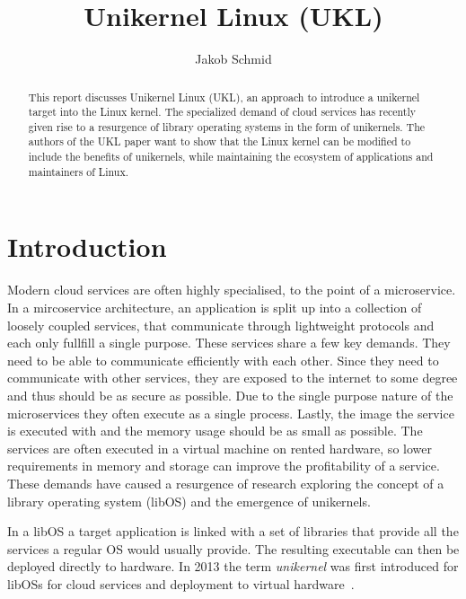 \documentclass[10pt,twocolumn,a4paper]{article}
\author{Jakob Schmid}
\begin{document}
\title{Unikernel Linux (UKL)}

\newcommand{\todo}[1]{{\texttt{[#1]}}}
\newcommand{\code}[1]{{\tt \small{#1}}}
\newcommand{\refsec}[1]{{§~\ref{#1}}}

\maketitle

\begin{abstract}
  This report discusses Unikernel Linux (UKL), an approach to introduce a
  unikernel target into the Linux kernel.
  The specialized demand of cloud services has recently given rise
  to a resurgence of library operating systems in the form of unikernels.
  The authors of the UKL paper want to show that the Linux kernel can be
  modified to include the benefits of unikernels, while maintaining the
  ecosystem of applications and maintainers of Linux.
\end{abstract}

\section{Introduction}\label{sec:introduction}
  Modern cloud services are often highly specialised, to the point of a microservice.
  In a mircoservice architecture, an application is split up into a collection of loosely coupled services,
  that communicate through lightweight protocols and each only fullfill a single purpose.
  These services share a few key demands. They need to be able to communicate 
  efficiently with each other. Since they need to communicate with other services,
  they are exposed to the internet to some degree and thus should be as secure as possible.
  Due to the single purpose nature of the microservices they often execute as a single process.
  Lastly, the image the service is executed with and the memory usage should be as small as possible.
  The services are often executed in a virtual machine on rented hardware, so lower requirements
  in memory and storage can improve the profitability of a service.
  These demands have caused a resurgence of research exploring the concept of 
  a library operating system (libOS) and the emergence of unikernels. 

  In a libOS a target application is linked with a set of
  libraries that provide all the services a regular OS would usually provide.
  The resulting executable can then be deployed directly to hardware.
  In 2013 the term \textit{unikernel} was first introduced for libOSs
  for cloud services and deployment to virtual hardware~\cite{madhavapeddy13}.
\end{document}
